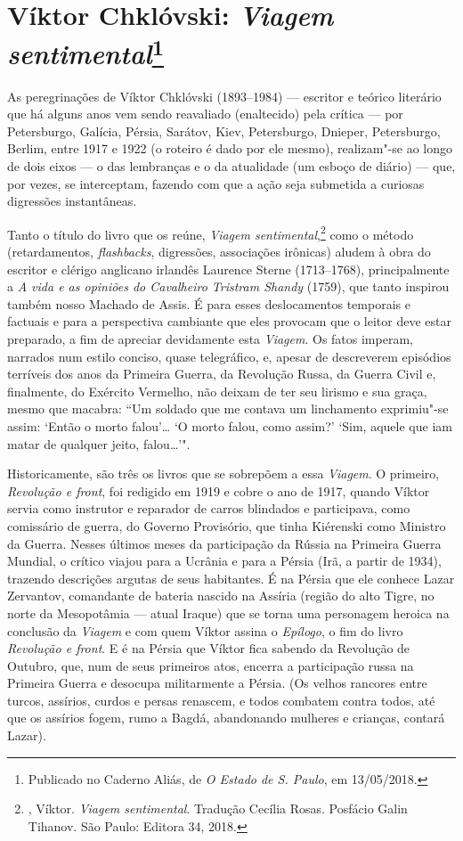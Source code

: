 \chapter{Víktor Chklóvski: \emph{Viagem sentimental}\footnote{Publicado no Caderno Aliás,
de \emph{O Estado de S. Paulo}, em 13/05/2018.}}

As peregrinações de Víktor Chklóvski (1893--1984) --- escritor e
teórico literário que há alguns anos vem sendo reavaliado
(enaltecido) pela crítica --- por Petersburgo, Galícia, Pérsia,
Sarátov, Kiev, Petersburgo, Dnieper, Petersburgo, Berlim, entre
1917 e 1922 (o roteiro é dado por ele mesmo), realizam"-se ao
longo de dois eixos --- o das lembranças e o da atualidade (um
esboço de diário) --- que, por vezes, se interceptam, fazendo com
que a ação seja submetida a curiosas digressões instantâneas.

Tanto o título do livro que os reúne, \emph{Viagem
sentimental},\footnote{, Víktor. \emph{Viagem
sentimental}. Tradução Cecília Rosas. Posfácio Galin Tihanov. São
Paulo: Editora 34, 2018.} como o método (retardamentos,
\emph{flashbacks}, digressões, associações irônicas) aludem à
obra do escritor e clérigo anglicano irlandês Laurence Sterne
(1713--1768), principalmente a \emph{A vida e as opiniões do
Cavalheiro Tristram Shandy} (1759), que tanto inspirou também
nosso Machado de Assis. É para esses deslocamentos temporais e
factuais e para a perspectiva cambiante que eles provocam que o
leitor deve estar preparado, a fim de apreciar devidamente esta
\emph{Viagem}. Os fatos imperam, narrados num estilo conciso,
quase telegráfico, e, apesar de descreverem episódios terríveis
dos anos da Primeira Guerra, da Revolução Russa, da Guerra
Civil e, finalmente, do Exército Vermelho, não deixam de ter seu
lirismo e sua graça, mesmo que macabra: ``Um soldado que me
contava um linchamento exprimiu"-se assim: `Então o morto
falou'\ldots{} `O morto falou, como assim?' `Sim, aquele que iam
matar de qualquer jeito, falou\ldots{}'".

Historicamente, são três os livros que se sobrepõem a essa
\emph{Viagem}. O primeiro, \emph{Revolução e front}, foi
redigido em 1919 e cobre o ano de 1917, quando Víktor servia
como instrutor e reparador de carros blindados e participava,
como comissário de guerra, do Governo Provisório, que tinha
Kiérenski como Ministro da Guerra. Nesses últimos meses da
participação da Rússia na Primeira Guerra Mundial, o crítico
viajou para a Ucrânia e para a Pérsia (Irã, a partir de 1934),
trazendo descrições argutas de seus habitantes. É na Pérsia que
ele conhece Lazar Zervantov, comandante de bateria nascido na
Assíria (região do alto Tigre, no norte da Mesopotâmia --- atual
Iraque) que se torna uma personagem heroica na conclusão da
\emph{Viagem} e com quem Víktor assina o \emph{Epílogo}, o fim
do livro \emph{Revolução e front}. E é na Pérsia que Víktor fica
sabendo da Revolução de Outubro, que, num de seus primeiros atos,
encerra a participação russa na Primeira Guerra e desocupa
militarmente a Pérsia. (Os velhos rancores entre turcos, assírios,
curdos e persas renascem, e todos combatem contra todos, até
que os assírios fogem, rumo a Bagdá, abandonando mulheres e
crianças, contará Lazar).

